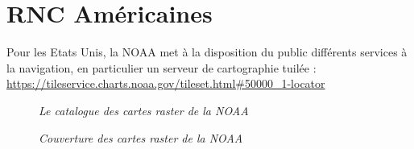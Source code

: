 \section{RNC Américaines}
Pour les Etats Unis, la NOAA met à la disposition du public différents services à la navigation, en particulier 
un serveur de cartographie tuilée : \\
\href{https://tileservice.charts.noaa.gov/tileset.html#50000\_1-locator}{https://tileservice.charts.noaa.gov/tileset.html\#50000\_1-locator}
\begin{center}
\begin{figure}[ht]
\caption{\label{equiProj}\textit{Le catalogue des cartes raster de la NOAA}}
\end{figure}
\end{center}
\begin{center}
\begin{figure}[ht]
\caption{\label{equiProj}\textit{Couverture des cartes raster de la NOAA}}
\end{figure}
\end{center}
